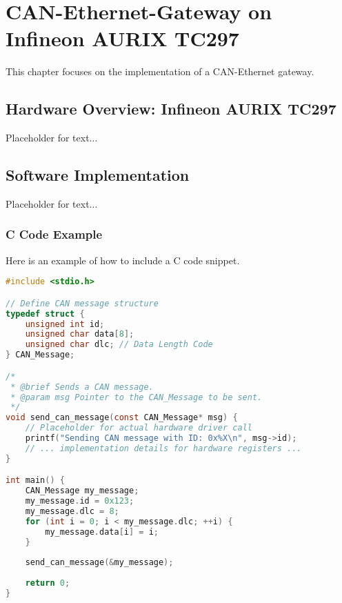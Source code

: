 \section{CAN-Ethernet-Gateway on Infineon AURIX TC297}
\label{sec:can-gateway}

This chapter focuses on the implementation of a CAN-Ethernet gateway.

\subsection{Hardware Overview: Infineon AURIX TC297}
Placeholder for text...

\subsection{Software Implementation}
Placeholder for text...

\subsubsection{C Code Example}
Here is an example of how to include a C code snippet.

\begin{lstlisting}[language=C, caption={Example of a simple CAN message sending function.}, label={lst:can_send}]
#include <stdio.h>

// Define CAN message structure
typedef struct {
    unsigned int id;
    unsigned char data[8];
    unsigned char dlc; // Data Length Code
} CAN_Message;

/*
 * @brief Sends a CAN message.
 * @param msg Pointer to the CAN_Message to be sent.
 */
void send_can_message(const CAN_Message* msg) {
    // Placeholder for actual hardware driver call
    printf("Sending CAN message with ID: 0x%X\n", msg->id);
    // ... implementation details for hardware registers ...
}

int main() {
    CAN_Message my_message;
    my_message.id = 0x123;
    my_message.dlc = 8;
    for (int i = 0; i < my_message.dlc; ++i) {
        my_message.data[i] = i;
    }
    
    send_can_message(&my_message);
    
    return 0;
}
\end{lstlisting}